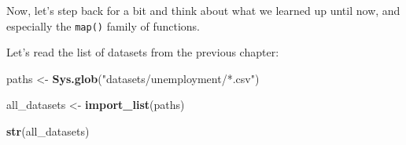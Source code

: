 \documentclass[
]{article}
\newenvironment{Shaded}{\begin{snugshade}}{\end{snugshade}}
\newcommand{\KeywordTok}[1]{\textcolor[rgb]{0.13,0.29,0.53}{\textbf{#1}}}
\newcommand{\NormalTok}[1]{#1}
\newcommand{\StringTok}[1]{\textcolor[rgb]{0.31,0.60,0.02}{#1}}
\begin{document}
Now, let's step back for a bit and think about what we learned up until now, and especially
the \texttt{map()} family of functions.

Let's read the list of datasets from the previous chapter:

\begin{Shaded}
\begin{Highlighting}[]
\NormalTok{paths \textless{}{-}}\StringTok{ }\KeywordTok{Sys.glob}\NormalTok{(}\StringTok{"datasets/unemployment/*.csv"}\NormalTok{)}

\NormalTok{all\_datasets \textless{}{-}}\StringTok{ }\KeywordTok{import\_list}\NormalTok{(paths)}

\KeywordTok{str}\NormalTok{(all\_datasets)}
\end{Highlighting}
\end{Shaded}
\end{document}
